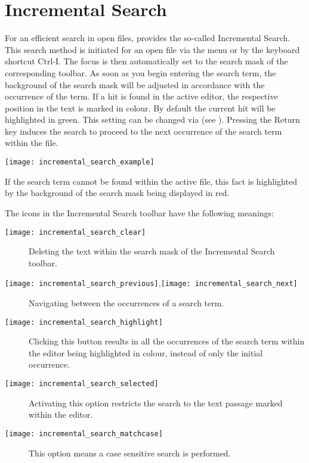 \section{Incremental Search}

For an efficient search in open files, \codeblocks provides the so-called Incremental Search. This search method is initiated for an open file via the menu  or by the keyboard shortcut Ctrl-I. The focus is then automatically set to the search mask of the corresponding toolbar. As soon as you begin entering the search term, the background of the search mask will be adjusted in accordance with the occurrence of the term. If a hit is found in the active editor, the respective position in the text is marked in colour. By default the current hit will be highlighted in green. This setting can be changed via  (see ). Pressing the Return key induces the search to proceed to the next occurrence of the search term within the file.

\texttt{[image: incremental\_search\_example]}

If the search term cannot be found within the active file, this fact is highlighted by the background of the search mask being displayed in red.

The icons in the Incremental Search toolbar have the following meanings:

\begin{description}
\item[\texttt{[image: incremental\_search\_clear]}] Deleting the text within the search mask of the Incremental Search toolbar.
\item[\texttt{[image: incremental\_search\_previous]},\texttt{[image: incremental\_search\_next]}] Navigating between the occurrences of a search term.
\item[\texttt{[image: incremental\_search\_highlight]}] Clicking this button results in all the occurrences of the search term within the editor being highlighted in colour, instead of only the initial occurrence.
\item[\texttt{[image: incremental\_search\_selected]}] Activating this option restricts the search to the text passage marked within the editor.
\item[\texttt{[image: incremental\_search\_matchcase]}] This option means a case sensitive search is performed.
\end{description}


